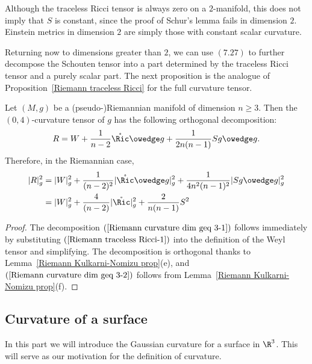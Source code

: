 Although the traceless Ricci tensor is always zero on a $2$-manifold, this does not imply that $S$ is constant, since the proof of Schur's lemma fails in dimension $2$. 
Einstein metrics in dimension $2$ are simply those with constant scalar curvature.\par
Returning now to dimensions greater than $2$, we can use $(7.27)$ to further decompose the Schouten tensor into a part determined by the traceless Ricci tensor and a 
purely scalar part. The next proposition is the analogue of Proposition~\ref{Riemann traceless Ricci} for the full curvature tensor.
\begin{proposition}
Let $(M,g)$ be a (pseudo-)Riemannian manifold of dimension $n\geq 3$. Then the $(0,4)$-curvature tensor of $g$ has the following orthogonal decomposition:
\begin{align}\label{Riemann curvature dim geq 3-1}
R=W+\frac{1}{n-2}\mathring{\Ric}\owedge g+\frac{1}{2n(n-1)}Sg\owedge g.
\end{align}
Therefore, in the Riemannian case,
\begin{equation}\label{Riemann curvature dim geq 3-2}
\begin{aligned}
|R|_g^2&=|W|^2_g+\frac{1}{(n-2)^2}|\mathring{\Ric}\owedge g|_g^2+\frac{1}{4n^2(n-1)^2}|Sg\owedge g|_g^2\\
&=|W|^2_g+\frac{4}{(n-2)}|\mathring{\Ric}|_g^2+\frac{2}{n(n-1)}S^2
\end{aligned}
\end{equation}
\begin{proof}
The decomposition $(\ref{Riemann curvature dim geq 3-1})$ follows immediately by substituting $(\ref{Riemann traceless Ricci-1})$ into the definition of the Weyl tensor 
and simplifying. The decomposition is orthogonal thanks to Lemma~\ref{Riemann Kulkarni-Nomizu prop}(e), and $(\ref{Riemann curvature dim geq 3-2})$ follows from  Lemma~\ref{Riemann Kulkarni-Nomizu prop}(f).
\end{proof}
\end{proposition}
\subsection{Curvature of a surface}
In this part we will introduce the Gaussian curvature for a surface in $\R^3$. This will serve as our motivation for the definition of curvature.
